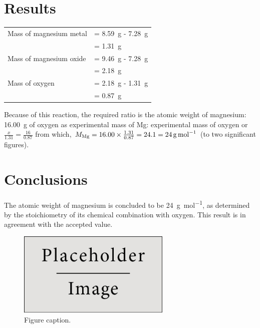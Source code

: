 \documentclass{article}
\begin{document}
\section{Results}

\begin{tabular}{ll}
Mass of magnesium metal & = \SI{8.59}{\gram} - \SI{7.28}{\gram}\\
& = \SI{1.31}{\gram}\\
Mass of magnesium oxide & = \SI{9.46}{\gram} - \SI{7.28}{\gram}\\
& = \SI{2.18}{\gram}\\
Mass of oxygen & = \SI{2.18}{\gram} - \SI{1.31}{\gram}\\
& = \SI{0.87}{\gram}
\end{tabular}

Because of this reaction, the required ratio is the atomic weight of magnesium: \SI{16.00}{\gram} of oxygen as experimental mass of Mg: experimental mass of oxygen or $\frac{x}{1.31}=\frac{16}{0.87}$ from which, $M_{\ce{Mg}} = 16.00 \times \frac{1.31}{0.87} = 24.1 = \SI{24}{\gram\per\mole}$ (to two significant figures).


\section{Conclusions}

The atomic weight of magnesium is concluded to be \SI{24}{\gram\per\mol}, as determined by the stoichiometry of its chemical combination with oxygen. This result is in agreement with the accepted value.

\begin{figure}[h]
\begin{center}
\includegraphics[width=0.65\textwidth]{placeholder} %
\caption{Figure caption.}
\end{center}
\end{figure}





\end{document}

